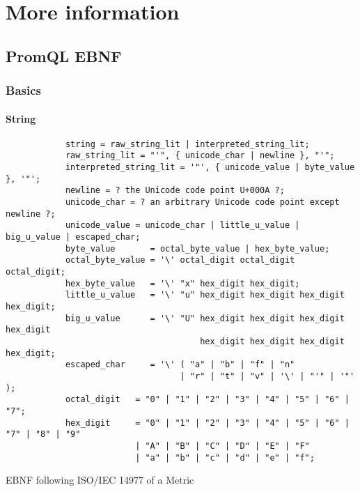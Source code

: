 \chapter{More information}
\section{PromQL EBNF}
\subsection{Basics}
\subsubsection{String}
\begin{listing}[H]
	\begin{samepage}
		\begin{verbatim}
			string = raw_string_lit | interpreted_string_lit;
			raw_string_lit = "'", { unicode_char | newline }, "'";
			interpreted_string_lit = '"', { unicode_value | byte_value }, '"';
			newline = ? the Unicode code point U+000A ?;
			unicode_char = ? an arbitrary Unicode code point except newline ?;
			unicode_value = unicode_char | little_u_value | big_u_value | escaped_char;
			byte_value       = octal_byte_value | hex_byte_value;
			octal_byte_value = '\' octal_digit octal_digit octal_digit;
			hex_byte_value   = '\' "x" hex_digit hex_digit;
			little_u_value   = '\' "u" hex_digit hex_digit hex_digit hex_digit;
			big_u_value      = '\' "U" hex_digit hex_digit hex_digit hex_digit
			                           hex_digit hex_digit hex_digit hex_digit;
			escaped_char     = '\' ( "a" | "b" | "f" | "n" 
			                       | "r" | "t" | "v" | '\' | "'" | '"' );
			octal_digit   = "0" | "1" | "2" | "3" | "4" | "5" | "6" | "7";
			hex_digit     = "0" | "1" | "2" | "3" | "4" | "5" | "6" | "7" | "8" | "9"
					      | "A" | "B" | "C" | "D" | "E" | "F"
					      | "a" | "b" | "c" | "d" | "e" | "f";
		\end{verbatim}
		\caption{EBNF following ISO/IEC 14977 of a Metric}
	\end{samepage}
\end{listing}

